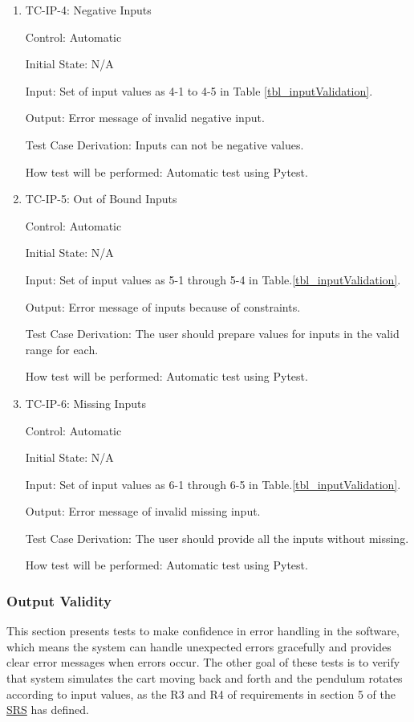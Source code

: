 \documentclass[12pt, titlepage]{article}
\begin{document}
\begin{enumerate}
\item{TC-IP-4: Negative Inputs}

Control: Automatic
					
Initial State: N/A 
					
Input: Set of input values as 4-1 to 4-5 in Table \ref{tbl_inputValidation}.
					
Output: Error message of invalid negative input.

Test Case Derivation: Inputs can not be negative values.
					
How test will be performed: Automatic test using Pytest.

\item{TC-IP-5: Out of Bound Inputs}

Control: Automatic
					
Initial State: N/A 
					
Input: Set of input values as 5-1 through 5-4 in Table.\ref{tbl_inputValidation}.
					
Output: Error message of inputs because of constraints.

Test Case Derivation: The user should prepare values for inputs in the valid range for each.

How test will be performed: Automatic test using Pytest.

\item{TC-IP-6: Missing Inputs}

Control: Automatic
					
Initial State: N/A 
					
Input: Set of input values as 6-1 through 6-5 in Table.\ref{tbl_inputValidation}.
					
Output: Error message of invalid missing input.

Test Case Derivation: The user should provide all the inputs without missing.
					
					
How test will be performed: Automatic test using Pytest.			
				
\end{enumerate}

\subsubsection{Output Validity \label{out_val}}

This section presents tests to make confidence in error handling in the software, which means the system can handle unexpected errors gracefully and provides clear error messages when errors occur.
The other goal of these tests is to verify that system simulates the cart moving back and forth and the pendulum rotates according to input values, as the R3 and R4 of requirements in section 5 of the  \href{https://github.com/MinMah23/CAS741-Project/tree/main/docs/SRS/SRS.pdf}{SRS} has defined.
\end{document}
